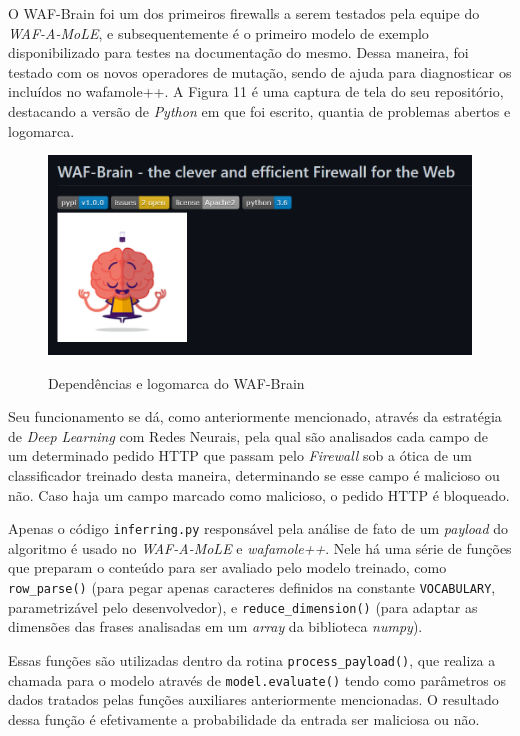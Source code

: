 O WAF-Brain \cite{waf_brain} foi um dos primeiros firewalls a serem testados pela equipe do \textit{WAF-A-MoLE}, e subsequentemente é o primeiro modelo de exemplo disponibilizado para testes na documentação do mesmo. Dessa maneira, foi testado com os novos operadores de mutação, sendo de ajuda para diagnosticar os incluídos no wafamole++. A Figura 11 é uma captura de tela do seu repositório, destacando a versão de \textit{Python} em que foi escrito, quantia de problemas abertos e logomarca.

\begin{figure}[ht]
    \centering
    \caption{Dependências e logomarca do WAF-Brain}
    \includegraphics[width=12.5cm]{figuras/WAFBrain.png} 
    \label{fig:internet} 
\end{figure}

Seu funcionamento se dá, como anteriormente mencionado, através da estratégia de \textit{Deep Learning} com Redes Neurais, pela qual são analisados cada campo de um determinado pedido HTTP que passam pelo \textit{Firewall} sob a ótica de um classificador treinado desta maneira, determinando se esse campo é malicioso ou não. Caso haja um campo marcado como malicioso, o pedido HTTP é bloqueado.

Apenas o código \verb+inferring.py+ responsável pela análise de fato de um \textit{payload} do algoritmo é usado no \textit{WAF-A-MoLE} e \textit{wafamole++}. Nele há uma série de funções que preparam o conteúdo para ser avaliado pelo modelo treinado, como \verb+row_parse()+ (para pegar apenas caracteres definidos na constante \verb+VOCABULARY+, parametrizável pelo desenvolvedor), e \verb+reduce_dimension()+ (para adaptar as dimensões das frases analisadas em um \textit{array} da biblioteca \textit{numpy}).

Essas funções são utilizadas dentro da rotina \verb+process_payload()+, que realiza a chamada para o modelo através de \verb+model.evaluate()+ tendo como parâmetros os dados tratados pelas funções auxiliares anteriormente mencionadas. O resultado dessa função é efetivamente a probabilidade da entrada ser maliciosa ou não.

